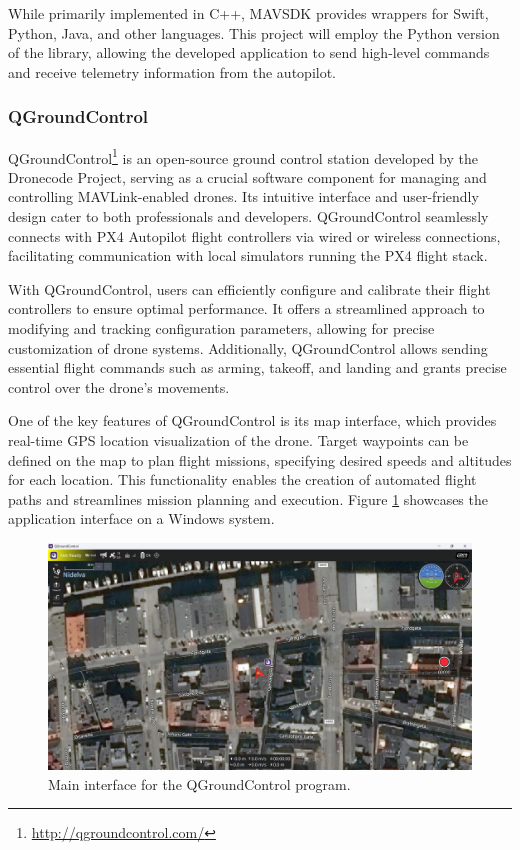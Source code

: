 While primarily implemented in C++, MAVSDK provides wrappers for Swift, Python, Java, and other languages. This project will employ the Python version of the library, allowing the developed application to send high-level commands and receive telemetry information from the autopilot.


\subsubsection{QGroundControl}
\label{subsec:qgc}

QGroundControl\footnote{\url{http://qgroundcontrol.com/}} is an open-source ground control station developed by the Dronecode Project, serving as a crucial software component for managing and controlling MAVLink-enabled drones. Its intuitive interface and user-friendly design cater to both professionals and developers. QGroundControl seamlessly connects with PX4 Autopilot flight controllers via wired or wireless connections, facilitating communication with local simulators running the PX4 flight stack.

With QGroundControl, users can efficiently configure and calibrate their flight controllers to ensure optimal performance. It offers a streamlined approach to modifying and tracking configuration parameters, allowing for precise customization of drone systems. Additionally, QGroundControl allows sending essential flight commands such as arming, takeoff, and landing and grants precise control over the drone's movements.

One of the key features of QGroundControl is its map interface, which provides real-time GPS location visualization of the drone. Target waypoints can be defined on the map to plan flight missions, specifying desired speeds and altitudes for each location. This functionality enables the creation of automated flight paths and streamlines mission planning and execution. Figure \ref{fig:qgc-map} showcases the application interface on a Windows system.

\begin{figure}
  \centering
  \includegraphics[width=\textwidth,keepaspectratio]{img/qgc-map.png}
  \caption{Main interface for the QGroundControl program.}
  \label{fig:qgc-map}
\end{figure}

